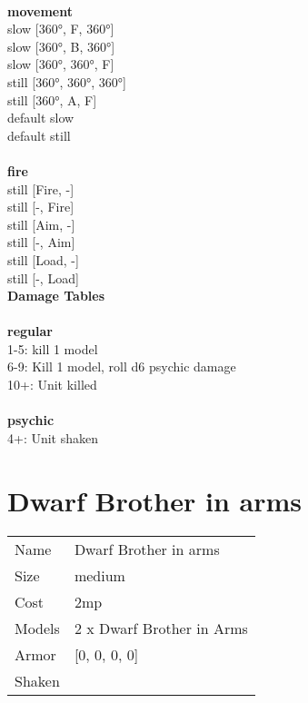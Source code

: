 \ \\ {\bf movement } \\
slow [360°, F, 360°] \\
slow [360°, B, 360°] \\
slow [360°, 360°, F] \\
still [360°, 360°, 360°] \\
still [360°, A, F] \\
default slow \\
default still \\
\ \\ {\bf fire } \\
still [Fire, -] \\
still [-, Fire] \\
still [Aim, -] \\
still [-, Aim] \\
still [Load, -] \\
still [-, Load] \\


{\bf Damage Tables} \\
\ \\ {\bf regular } \\
1-5: kill 1 model \\
6-9: Kill 1 model, roll d6 psychic damage \\
10+: Unit killed \\
\ \\ {\bf psychic } \\
4+: Unit shaken \\










\pagebreak\pagebreak

\section{ Dwarf Brother in arms }

\begin{tabular}{ll}
  Name & Dwarf Brother in arms \\
  Size & medium\\
  Cost & 2mp\\
  Models & 2 x Dwarf Brother in Arms\\
  Armor & [0, 0, 0, 0]\\
  Shaken & \\
\end{tabular}

